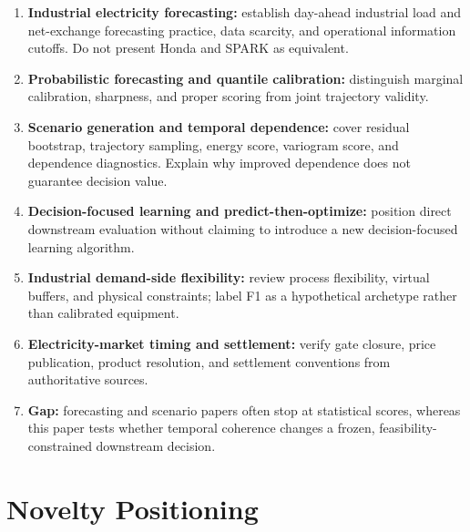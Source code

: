 \documentclass[10pt,twocolumn]{article}
\begin{document}
\begin{enumerate}
  \item \textbf{Industrial electricity forecasting:} establish day-ahead
  industrial load and net-exchange forecasting practice, data scarcity, and
  operational information cutoffs. Do not present Honda and SPARK as equivalent.
  \item \textbf{Probabilistic forecasting and quantile calibration:} distinguish
  marginal calibration, sharpness, and proper scoring from joint trajectory
  validity.
  \item \textbf{Scenario generation and temporal dependence:} cover residual
  bootstrap, trajectory sampling, energy score, variogram score, and dependence
  diagnostics. Explain why improved dependence does not guarantee decision value.
  \item \textbf{Decision-focused learning and predict-then-optimize:} position
  direct downstream evaluation without claiming to introduce a new
  decision-focused learning algorithm.
  \item \textbf{Industrial demand-side flexibility:} review process flexibility,
  virtual buffers, and physical constraints; label F1 as a hypothetical
  archetype rather than calibrated equipment.
  \item \textbf{Electricity-market timing and settlement:} verify gate closure,
  price publication, product resolution, and settlement conventions from
  authoritative sources.
  \item \textbf{Gap:} forecasting and scenario papers often stop at statistical
  scores, whereas this paper tests whether temporal coherence changes a frozen,
  feasibility-constrained downstream decision.
\end{enumerate}

\section{Novelty Positioning}
\label{app:novelty}
\end{document}
